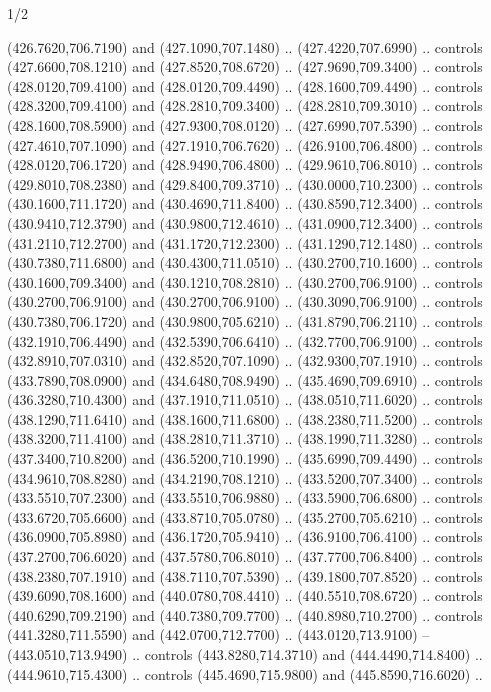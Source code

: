 \begin{flagdescription}{1/2}
\begin{scope}[xshift=0.5\flaglength]
\begin{scope}[scale=0.00745\flagwidth,xshift=-12.1mm,yshift=41.7mm]
\begin{scope}[y=0.80pt, x=0.80pt, yscale=-1, xscale=1, inner sep=0pt, outer sep=0pt]
\begin{scope}[cm={{1.33333,0.0,0.0,-1.33333,(0.0,114.66667)}}]
\begin{scope}[scale=0.100]
  (426.7620,706.7190) and (427.1090,707.1480) .. (427.4220,707.6990) .. controls
  (427.6600,708.1210) and (427.8520,708.6720) .. (427.9690,709.3400) .. controls
  (428.0120,709.4100) and (428.0120,709.4490) .. (428.1600,709.4490) .. controls
  (428.3200,709.4100) and (428.2810,709.3400) .. (428.2810,709.3010) .. controls
  (428.1600,708.5900) and (427.9300,708.0120) .. (427.6990,707.5390) .. controls
  (427.4610,707.1090) and (427.1910,706.7620) .. (426.9100,706.4800) .. controls
  (428.0120,706.1720) and (428.9490,706.4800) .. (429.9610,706.8010) .. controls
  (429.8010,708.2380) and (429.8400,709.3710) .. (430.0000,710.2300) .. controls
  (430.1600,711.1720) and (430.4690,711.8400) .. (430.8590,712.3400) .. controls
  (430.9410,712.3790) and (430.9800,712.4610) .. (431.0900,712.3400) .. controls
  (431.2110,712.2700) and (431.1720,712.2300) .. (431.1290,712.1480) .. controls
  (430.7380,711.6800) and (430.4300,711.0510) .. (430.2700,710.1600) .. controls
  (430.1600,709.3400) and (430.1210,708.2810) .. (430.2700,706.9100) .. controls
  (430.2700,706.9100) and (430.2700,706.9100) .. (430.3090,706.9100) .. controls
  (430.7380,706.1720) and (430.9800,705.6210) .. (431.8790,706.2110) .. controls
  (432.1910,706.4490) and (432.5390,706.6410) .. (432.7700,706.9100) .. controls
  (432.8910,707.0310) and (432.8520,707.1090) .. (432.9300,707.1910) .. controls
  (433.7890,708.0900) and (434.6480,708.9490) .. (435.4690,709.6910) .. controls
  (436.3280,710.4300) and (437.1910,711.0510) .. (438.0510,711.6020) .. controls
  (438.1290,711.6410) and (438.1600,711.6800) .. (438.2380,711.5200) .. controls
  (438.3200,711.4100) and (438.2810,711.3710) .. (438.1990,711.3280) .. controls
  (437.3400,710.8200) and (436.5200,710.1990) .. (435.6990,709.4490) .. controls
  (434.9610,708.8280) and (434.2190,708.1210) .. (433.5200,707.3400) .. controls
  (433.5510,707.2300) and (433.5510,706.9880) .. (433.5900,706.6800) .. controls
  (433.6720,705.6600) and (433.8710,705.0780) .. (435.2700,705.6210) .. controls
  (436.0900,705.8980) and (436.1720,705.9410) .. (436.9100,706.4100) .. controls
  (437.2700,706.6020) and (437.5780,706.8010) .. (437.7700,706.8400) .. controls
  (438.2380,707.1910) and (438.7110,707.5390) .. (439.1800,707.8520) .. controls
  (439.6090,708.1600) and (440.0780,708.4410) .. (440.5510,708.6720) .. controls
  (440.6290,709.2190) and (440.7380,709.7700) .. (440.8980,710.2700) .. controls
  (441.3280,711.5590) and (442.0700,712.7700) .. (443.0120,713.9100) --
  (443.0510,713.9490) .. controls (443.8280,714.3710) and (444.4490,714.8400) ..
  (444.9610,715.4300) .. controls (445.4690,715.9800) and (445.8590,716.6020) ..

\end{scope}
\end{scope}
\end{scope}
\end{scope}
\end{scope}
\end{flagdescription}
